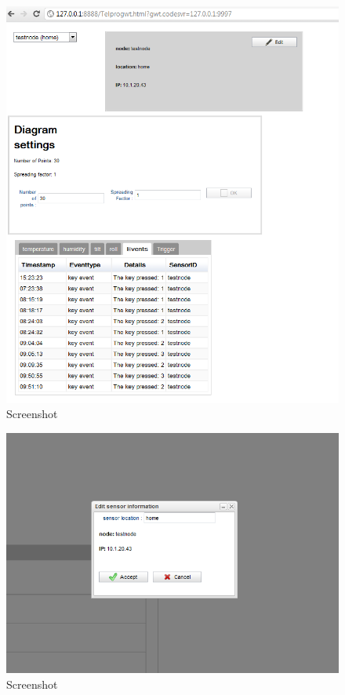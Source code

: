 \documentclass[12pt,a4paper,twoside]{article}
\begin{document}
\begin{figure}[htbp]
   \centering
   \includegraphics[width=12cm]{fig/screen3.png}
   \caption{Screenshot}
   \label{screen3}
\end{figure}

\begin{figure}[htbp]
   \centering
   \includegraphics[width=12cm]{fig/screen4.png}
   \caption{Screenshot}
   \label{screen4}
\end{figure}
  
\end{document}
